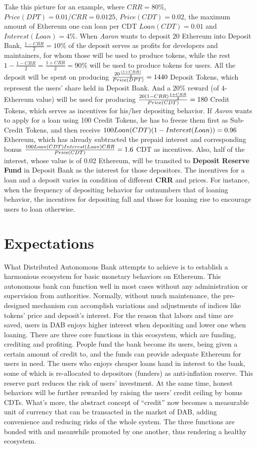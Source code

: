 \documentclass[review]{elsarticle}
\begin{document}
Take this picture for an example, where ${CRR = 80\%}$, ${Price(DPT) = 0.01/CRR = 0.0125}$, ${Price(CDT) = 0.02}$, the maximum amount of Ethereum one can loan per CDT ${Loan(CDT) = 0.01}$ and ${Interest(Loan) = 4\%}$. When \emph{Aaron} wants to deposit $20$ Ethereum into Deposit Bank, ${\frac{1 - CRR}{2} = 10\%}$ of the deposit serves as profits for developers and maintainers, for whom those will be used to produce tokens, while the rest ${1 - \frac{1 - CRR}{2} = \frac{1 + CRR}{2} = 90\%}$ will be used to produce tokens for users. All the deposit will be spent on producing ${\frac{20 \* \frac{(1 + CRR)}{2}}{Price(DPT)} = 1440}$ Deposit Tokens, which represent the users' share held in Deposit Bank. And a $20\%$ reward (of $4$-Ethereum value) will be used for producing ${\frac{20 \* (1 - CRR) \* \frac{1 + CRR}{2}}{Price(CDT)} = 180}$ Credit Tokens, which serves as incentives for his/her depositing behavior. If \emph{Aaron} wants to apply for a loan using 100 Credit Tokens, he has to freeze them first as Sub-Credit Tokens, and then receive ${100 \* Loan(CDT) \* (1 - Interest(Loan)) = 0.96}$ Ethereum, which has already subtracted the prepaid interest and corresponding bonus ${\frac{100 \* Loan(CDT) \* Interest(Loan) \* CRR}{Price(CDT)} = 1.6}$ CDT as incentives. Also, half of the interest, whose value is of 0.02 Ethereum, will be transited to \textbf{Deposit Reserve Fund} in Deposit Bank as the interest for those depositors.
The incentives for a loan and a deposit varies in condition of different \textbf{CRR} and prices. For instance, when the frequency of depositing behavior far outnumbers that of loaning behavior, the incentives for depositing fall and those for loaning rise to encourage users to loan otherwise.

\section{Expectations}
What Distributed Autonomous Bank attempts to achieve is to establish a harmonious ecosystem for basic monetary behaviors on Ethereum. This autonomous bank can function well in most cases without any administration or supervision from authorities. Normally, without much maintenance, the pre-designed mechanism can accomplish variations and adjustments of indices like tokens' price and deposit's interest. For the reason that labors and time are saved, users in DAB enjoys higher interest when depositing and lower one when loaning.
There are three core functions in this ecosystem, which are funding, crediting and profiting. People fund the bank become its users, being given a certain amount of credit to, and the funds can provide adequate Ethereum for users in need. The users who enjoys cheaper loans hand in interest to the bank, some of which is re-allocated to depositors (funders) as anti-inflation reserve. This reserve part reduces the risk of users' investment. At the same time, honest behaviors will be further rewarded by raising the users' credit ceiling by bonus CDTs. What's more, the abstract concept of ``credit'' now becomes a measurable unit of currency that can be transacted in the market of DAB, adding convenience and reducing risks of the whole system. The three functions are bonded with and meanwhile promoted by one another, thus rendering a healthy ecosystem.
\end{document}
